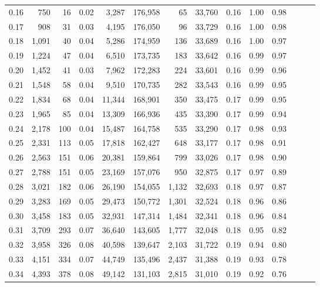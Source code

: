 \begin{tabular}{rrrrrrrrrrrrrr}
0.16 &    750 &   16 &  0.02 &    3,287 &  176,958 &      65 &  33,760 &  0.16 &  1.00 &      0.98 \\
0.17 &    908 &   31 &  0.03 &    4,195 &  176,050 &      96 &  33,729 &  0.16 &  1.00 &      0.98 \\
0.18 &  1,091 &   40 &  0.04 &    5,286 &  174,959 &     136 &  33,689 &  0.16 &  1.00 &      0.97 \\
0.19 &  1,224 &   47 &  0.04 &    6,510 &  173,735 &     183 &  33,642 &  0.16 &  0.99 &      0.97 \\
0.20 &  1,452 &   41 &  0.03 &    7,962 &  172,283 &     224 &  33,601 &  0.16 &  0.99 &      0.96 \\
0.21 &  1,548 &   58 &  0.04 &    9,510 &  170,735 &     282 &  33,543 &  0.16 &  0.99 &      0.95 \\
0.22 &  1,834 &   68 &  0.04 &   11,344 &  168,901 &     350 &  33,475 &  0.17 &  0.99 &      0.95 \\
0.23 &  1,965 &   85 &  0.04 &   13,309 &  166,936 &     435 &  33,390 &  0.17 &  0.99 &      0.94 \\
0.24 &  2,178 &  100 &  0.04 &   15,487 &  164,758 &     535 &  33,290 &  0.17 &  0.98 &      0.93 \\
0.25 &  2,331 &  113 &  0.05 &   17,818 &  162,427 &     648 &  33,177 &  0.17 &  0.98 &      0.91 \\
0.26 &  2,563 &  151 &  0.06 &   20,381 &  159,864 &     799 &  33,026 &  0.17 &  0.98 &      0.90 \\
0.27 &  2,788 &  151 &  0.05 &   23,169 &  157,076 &     950 &  32,875 &  0.17 &  0.97 &      0.89 \\
0.28 &  3,021 &  182 &  0.06 &   26,190 &  154,055 &   1,132 &  32,693 &  0.18 &  0.97 &      0.87 \\
0.29 &  3,283 &  169 &  0.05 &   29,473 &  150,772 &   1,301 &  32,524 &  0.18 &  0.96 &      0.86 \\
0.30 &  3,458 &  183 &  0.05 &   32,931 &  147,314 &   1,484 &  32,341 &  0.18 &  0.96 &      0.84 \\
0.31 &  3,709 &  293 &  0.07 &   36,640 &  143,605 &   1,777 &  32,048 &  0.18 &  0.95 &      0.82 \\
0.32 &  3,958 &  326 &  0.08 &   40,598 &  139,647 &   2,103 &  31,722 &  0.19 &  0.94 &      0.80 \\
0.33 &  4,151 &  334 &  0.07 &   44,749 &  135,496 &   2,437 &  31,388 &  0.19 &  0.93 &      0.78 \\
0.34 &  4,393 &  378 &  0.08 &   49,142 &  131,103 &   2,815 &  31,010 &  0.19 &  0.92 &      0.76 \\

\end{tabular}
